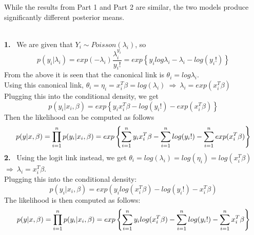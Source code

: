 \documentclass[12pt]{article}
\newenvironment{problem}[2][Problem]{\begin{trivlist}
\item[\hskip \labelsep {\bfseries #1}\hskip \labelsep {\bfseries #2.}]}{\end{trivlist}}
\begin{document}
\begin{problem}{4}
While the results from Part 1 and Part 2 are similar,  the two models produce significantly different posterior means.   \\

\end{problem}

\begin{problem}{5}
\text{ }\\
\textbf{1.} \ We are given that $Y_i\sim Poisson(\lambda_i)$, so\\
$$p(y_{i}|\lambda_{i})=exp(-\lambda_{i})\frac{\lambda_{i}^{y_{i}}}{y_{i}!}=exp\left\lbrace y_{i}log \lambda_{i}-\lambda_{i}-log(y_{i}!)\right\rbrace$$
From the above it is seen that the canonical link is $\theta_{i}=log \lambda_{i}$.\\
Using this canonical link, $\theta_{i}=\eta_{i}=x_{i}^{T}\beta=log(\lambda_{i}) \ \Longrightarrow \ \lambda_{i}=exp(x_{i}^{T} \beta)$\\
Plugging this into the conditional density, we get\\
$$p(y_{i}|x_{i}, \beta)=exp\left\lbrace y_{i}x_{i}^{T} \beta -log(y_{i}!)-exp(x_{i}^{T} \beta)\right\rbrace$$
Then the likelihood can be computed as follows \\
$$p(y|x, \beta)=\prod_{i=1}^{n}p(y_{i}|x_{i},\beta)\\
=exp\left\lbrace\sum_{i=1}^{n} y_{i}x_{i}^{T} \beta -\sum_{i=1}^{n}log(y_{i}!)-\sum_{i=1}^{n} exp(x_{i}^{T} \beta)\right\rbrace$$
\textbf{2.} \  Using the logit link instead, we get $\theta_{i}=log(\lambda_{i})=log(\eta_{i})=log(x_{i}^{T}\beta)$\\
$\Longrightarrow \ \lambda_{i}=x_{i}^{T}\beta$.\\
Plugging this into the conditional density:\\
$$p(y_{i}|x_{i},\beta)=exp(y_{i}log(x_{i}^{T}\beta)-log(y_{i}!)-x_{i}^{T}\beta)$$
The likelihood is then computed as follows: \\
$$p(y|x, \beta)=\prod_{i=1}^{n}p(y_{i}|x_{i},\beta)\\
=exp\left\lbrace \sum_{i=1}^{n} y_{i} log(x_{i}^{T} \beta) -\sum_{i=1}^{n}log(y_{i}!)-\sum_{i=1}^{n} x_{i}^{T} \beta\right\rbrace$$

\end{problem}
\end{document}
